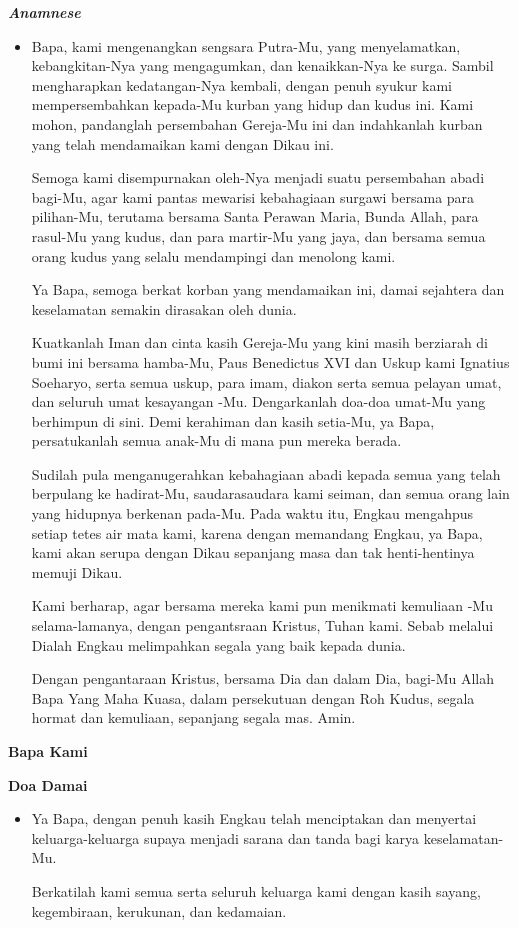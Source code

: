 \documentclass[10pt]{book}
\makeatletter
\newcommand{\subjudul}[1]{%
  {\parindent \z@ \normalfont
    \interlinepenalty\@M \bfseries #1\par\nobreak \vskip 20\p@ }}
\newcommand{\lagu}[1]{%
  {\parindent \z@ \normalfont
    \interlinepenalty\@M \bfseries \emph{#1}\par\nobreak \vskip 20\p@ }}
\newcommand{\BI}[1]{\begin{itemize} \item[I:] #1 \end{itemize}}
\makeatother
\begin{document}
\lagu{Anamnese}

\BI{Bapa, kami mengenangkan sengsara Putra-Mu, yang menyelamatkan, kebangkitan-Nya yang mengagumkan, dan kenaikkan-Nya ke surga. Sambil mengharapkan kedatangan-Nya kembali, dengan penuh syukur kami mempersembahkan kepada-Mu kurban yang hidup dan kudus ini. Kami mohon, pandanglah persembahan Gereja-Mu ini dan indahkanlah kurban yang telah mendamaikan kami dengan Dikau ini.

Semoga kami disempurnakan oleh-Nya menjadi suatu persembahan abadi bagi-Mu, agar kami pantas mewarisi kebahagiaan surgawi bersama para pilihan-Mu, terutama bersama Santa Perawan Maria, Bunda Allah, para rasul-Mu yang kudus, dan para martir-Mu yang jaya, dan bersama semua orang kudus yang selalu mendampingi dan menolong kami.

Ya Bapa, semoga berkat korban yang mendamaikan ini, damai sejahtera dan keselamatan semakin dirasakan oleh dunia.

Kuatkanlah Iman dan cinta kasih Gereja-Mu yang kini masih berziarah di bumi ini bersama hamba-Mu, Paus Benedictus XVI dan Uskup kami Ignatius Soeharyo, serta semua uskup, para imam, diakon serta semua pelayan umat, dan seluruh umat kesayangan -Mu. Dengarkanlah doa-doa umat-Mu yang berhimpun di sini. Demi kerahiman dan kasih setia-Mu, ya Bapa, persatukanlah semua anak-Mu di mana pun mereka berada.

Sudilah pula menganugerahkan kebahagiaan abadi kepada semua yang telah berpulang ke hadirat-Mu, saudarasaudara kami seiman, dan semua orang lain yang hidupnya berkenan pada-Mu. Pada waktu itu, Engkau mengahpus setiap tetes air mata kami, karena dengan memandang Engkau, ya Bapa, kami akan serupa dengan Dikau sepanjang masa dan tak henti-hentinya memuji Dikau.

Kami berharap, agar bersama mereka kami pun menikmati kemuliaan -Mu selama-lamanya, dengan pengantsraan Kristus, Tuhan kami. Sebab melalui Dialah Engkau melimpahkan segala yang baik kepada dunia.

Dengan pengantaraan Kristus, bersama Dia dan dalam Dia, bagi-Mu Allah Bapa Yang Maha Kuasa, dalam persekutuan dengan Roh Kudus, segala hormat dan kemuliaan, sepanjang segala mas. Amin.}

\subjudul{Bapa Kami}

\subjudul{Doa Damai}

\BI{Ya Bapa, dengan penuh kasih Engkau telah menciptakan dan menyertai keluarga-keluarga supaya menjadi sarana dan tanda bagi karya keselamatan-Mu.

Berkatilah kami semua serta seluruh keluarga kami dengan kasih sayang, kegembiraan, kerukunan, dan kedamaian.}
\end{document}
